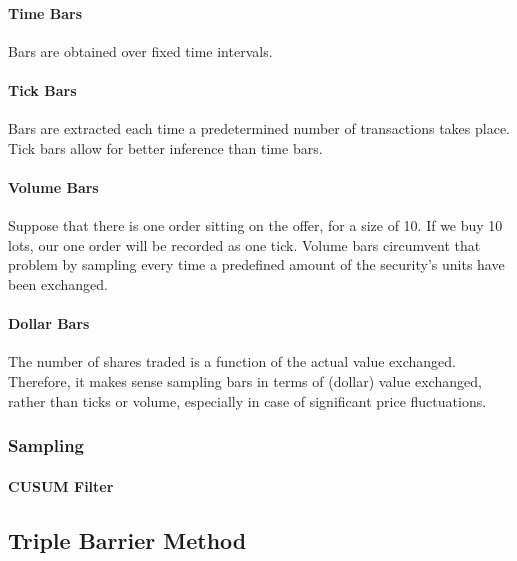 \documentclass{article}
\begin{document}
\paragraph{Time Bars}
Bars are obtained over fixed time intervals.

\paragraph{Tick Bars}
Bars are extracted each time a predetermined number of transactions takes place. Tick bars allow for better inference than time bars.

\paragraph{Volume Bars}
Suppose that there is one order sitting on the offer, for a size of 10. If we buy 10 lots, our one order will be recorded as one tick. Volume bars circumvent that problem by sampling every time a predefined amount of the security’s units have been exchanged.

\paragraph{Dollar Bars}
The number of shares traded is a function of the actual value exchanged. Therefore, it makes sense sampling bars in terms of (dollar) value exchanged, rather than ticks or volume, especially in case of significant price fluctuations.

\subsubsection{Sampling}
\paragraph{CUSUM Filter}

\subsection{Triple Barrier Method \cite{advances_in_ml}}
\end{document}
